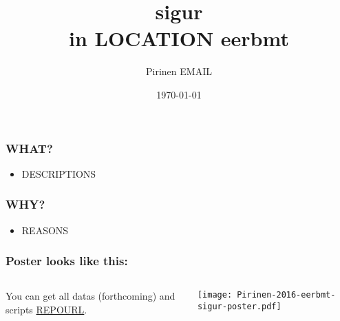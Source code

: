\documentclass{beamer}
\title{sigur\\
\scriptsize{in LOCATION eerbmt}}
\author{Pirinen \scriptsize \guilsinglleft{}EMAIL\guilsinglright{}}
\institute{AFFILIATION1\\
AFFILIATION2}
\date{\today}
\begin{document}

\maketitle

\begin{frame}
    \frametitle{WHAT?}
    \begin{itemize}
        \item DESCRIPTIONS
    \end{itemize}
\end{frame}


\begin{frame}
    \frametitle{WHY?}
    \begin{itemize}
        \item REASONS
    \end{itemize}
\end{frame}

\begin{frame}
    \frametitle{Poster looks like this:}
    \begin{minipage}[0.2\textheight]{\textwidth}
\begin{columns}[T]
\begin{column}{0.8\textwidth}
    You can get all datas (forthcoming) and scripts \url{REPOURL}.
\end{column}
\begin{column}{0.2\textwidth}
    \texttt{[image: Pirinen-2016-eerbmt-sigur-poster.pdf]}
\end{column}
\end{columns}
\end{minipage}
\end{frame}
\end{document}
